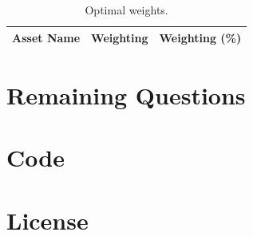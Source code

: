\documentclass[a4paper]{article}
\begin{document}
\begin{table}[H]
    \begin{center}
    \begin{tabular}{ |l|l|l| }
        \hline
        Asset Name & Weighting & Weighting (\%) \\
        \hline

        

        \hline
    \end{tabular}
    \caption{Optimal weights.}
    \label{table_optimal_weights}
    \end{center}
\end{table}



\section{Remaining Questions}

\appendix

\section{Code}



\section{License}

\doclicenseThis
\end{document}
